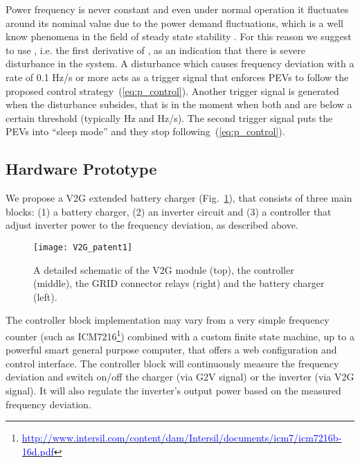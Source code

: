 \documentclass[final,12pt]{elsarticle}
\begin{document}
Power frequency is never constant and even under normal operation it
fluctuates around its nominal value due to the power demand fluctuations, which
is a well know phenomena in the field of steady state stability
\cite{machowski2011power}. For this reason we suggest to use ,
i.e. the first derivative of , as an indication that there is severe
disturbance in the system. A disturbance which causes frequency deviation with a
rate of 0.1 Hz/s or more acts as a trigger signal that enforces PEVs to follow
the proposed control strategy~(\ref{eq:p_control}). Another trigger signal is generated when the
disturbance subsides, that is in the moment when both  and  are below a certain threshold (typically  Hz and
 Hz/s). The second trigger signal puts the PEVs into
``sleep mode'' and they stop following~(\ref{eq:p_control}).

\subsection{Hardware Prototype}
\label{hardware}

We propose a V2G extended battery charger
(Fig.~\ref{fig:hw_schematic}), that consists of three main
blocks:
(1) a battery charger, (2) an inverter circuit and (3) a controller that adjust inverter power to the frequency deviation, as described above.

\begin{figure}[!htb]
\centering
\texttt{[image: V2G\_patent1]}
\caption{A detailed schematic of the V2G module (top), the controller (middle),
the GRID connector relays (right) and the battery charger (left).}
\label{fig:hw_schematic}
\end{figure}


The controller block implementation may vary from a very simple frequency
counter (such as ICM7216\footnote{\href{http://www.intersil.com/content/dam/Intersil/documents/icm7/icm7216b-16d.pdf}{\textcolor{blue}{http://www.intersil.com/content/dam/Intersil/documents/icm7/icm7216b-16d.pdf}}}) combined with a custom finite state machine, up to a powerful smart general
purpose computer, that offers a web configuration and control interface.
The controller block will continuously measure the frequency deviation and
switch on/off the charger (via G2V signal) or the inverter (via V2G signal). It will also regulate the inverter's output power based on the measured frequency deviation.
\end{document}
